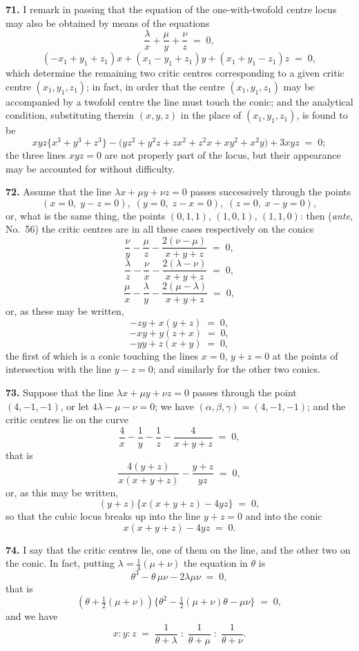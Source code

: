 \documentclass[11pt,a4paper]{article}
\begin{document}
\medskip

\textbf{71.} I remark in passing that the equation of the one-with-twofold centre locus may also be obtained by means of the equations
\[
\frac{\lambda}{x} + \frac{\mu}{y} + \frac{\nu}{z} \;=\; 0,
\]
\[
(-x_{1}+y_{1}+z_{1})x + (x_{1}-y_{1}+z_{1})y + (x_{1}+y_{1}-z_{1})z \;=\; 0,
\]
which determine the remaining two critic centres corresponding to a given critic centre $(x_{1},y_{1},z_{1})$; in fact, in order that the centre $(x_{1},y_{1},z_{1})$ may be accompanied by a twofold centre the line must touch the conic; and the analytical condition, substituting therein $(x,y,z)$ in the place of $(x_{1},y_{1},z_{1})$, is found to be
\[
xyz\bigl\{x^{3}+y^{3}+z^{3}\bigr\} - \bigl(yz^{2}+y^{2}z+zx^{2}+z^{2}x+xy^{2}+x^{2}y\bigr) + 3xyz \;=\; 0;
\]
the three lines $xyz = 0$ are not properly part of the locus, but their appearance may be accounted for without difficulty.

\medskip

\textbf{72.} Assume that the line $\lambda x + \mu y + \nu z = 0$ passes successively through the points
\[
(x=0,\;y-z=0),\;(y=0,\;z-x=0),\;(z=0,\;x-y=0),
\]
or, what is the same thing, the points $(0,1,1)$, $(1,0,1)$, $(1,1,0)$: then (\emph{ante}, No.~56) the critic centres are in all these cases respectively on the conics
\[
\frac{\nu}{y} - \frac{\mu}{z} - \frac{2(\nu-\mu)}{x+y+z} \;=\; 0,
\]
\[
\frac{\lambda}{z} - \frac{\nu}{x} - \frac{2(\lambda-\nu)}{x+y+z} \;=\; 0,
\]
\[
\frac{\mu}{x} - \frac{\lambda}{y} - \frac{2(\mu-\lambda)}{x+y+z} \;=\; 0,
\]
or, as these may be written,
\[
-zy + x(y+z) \;=\; 0,
\]
\[
-xy + y(z+x) \;=\; 0,
\]
\[
-yy + z(x+y) \;=\; 0,
\]
the first of which is a conic touching the lines $x=0$, $y+z=0$ at the points of intersection with the line $y-z=0$; and similarly for the other two conics.

\medskip

\textbf{73.} Suppose that the line $\lambda x + \mu y + \nu z = 0$ passes through the point $(4,-1,-1)$, or let $4\lambda - \mu - \nu = 0$; we have $(\alpha,\beta,\gamma) = (4,-1,-1)$; and the critic centres lie on the curve
\[
\frac{4}{x} - \frac{1}{y} - \frac{1}{z} - \frac{4}{x+y+z} \;=\; 0,
\]
that is
\[
\frac{4(y+z)}{x(x+y+z)} - \frac{y+z}{yz} \;=\; 0,
\]
or, as this may be written,
\[
(y+z)\bigl\{x(x+y+z) - 4yz\bigr\} \;=\; 0,
\]
so that the cubic locus breaks up into the line $y+z=0$ and into the conic
\[
x(x+y+z) - 4yz \;=\; 0.
\]

\medskip

\textbf{74.} I say that the critic centres lie, one of them on the line, and the other two on the conic. In fact, putting $\lambda = \tfrac{1}{4}(\mu+\nu)$ the equation in $\theta$ is
\[
\theta^{3}-\theta\,\mu\nu - 2\lambda\mu\nu \;=\; 0,
\]
that is
\[
(\theta+\tfrac{1}{2}(\mu+\nu))\bigl\{\theta^{2}-\tfrac{1}{2}(\mu+\nu)\theta-\mu\nu\bigr\} \;=\; 0,
\]
and we have
\[
x:y:z \;=\; \frac{1}{\theta+\lambda} \;:\; \frac{1}{\theta+\mu} \;:\; \frac{1}{\theta+\nu}.
\]
\end{document}
